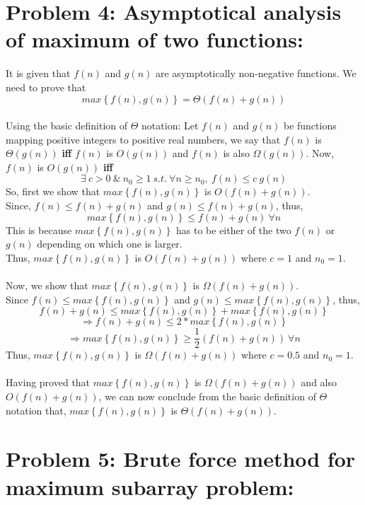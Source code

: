\documentclass[12pt]{report}
\begin{document}
\section{Problem 4: Asymptotical analysis of maximum of two functions:}
It is given that $f(n)$ and $g(n)$ are asymptotically non-negative functions. We need to prove that 
\[max\left \{ f(n), g(n) \right \} = \Theta (f(n) + g(n))\]
\\
Using the basic definition of $\Theta$ notation: 
Let $f(n)$ and $g(n)$ be functions mapping positive integers to positive real numbers, we say that $f(n)$ is $\Theta(g(n))$ \textbf{iff} $f(n)$ is $O(g(n))$ and $f(n)$ is also $\Omega(g(n))$. 
Now, $f(n)$ is $O(g(n))$ \textbf{iff} 
\[\exists\ c > 0 \ \& \ n_{0} \geq 1 \ s.t. \ \forall n \geq n_{0}, \ f(n) \leq c \ g(n)\]
So, first we show that $max\left \{ f(n), g(n) \right \}$ is $O(f(n) + g(n))$. 
\\
Since, $f(n) \leq f(n) + g(n)$ and $g(n) \leq f(n) + g(n)$, thus, 
\[max\left \{ f(n), g(n) \right \} \leq f(n) + g(n) \ \forall n\]
This is because $max\left \{ f(n), g(n) \right \}$ has to be either of the two $f(n)$ or $g(n)$ depending on which one is larger. 
\\
Thus, $max\left \{ f(n), g(n) \right \}$ is $O(f(n) + g(n))$ where $c = 1$ and $n_{0} = 1$.
\\
\\
Now, we show that $max\left \{ f(n), g(n) \right \}$ is $\Omega(f(n) + g(n))$. 
\\
Since $f(n) \leq max\left \{ f(n), g(n) \right \}$ and $g(n) \leq max\left \{ f(n), g(n) \right \}$, thus, 
\[f(n) + g(n) \leq max\left \{ f(n), g(n) \right \} + max\left \{ f(n), g(n) \right \}\]
\[\Rightarrow f(n) + g(n) \leq 2*max\left \{ f(n), g(n) \right \}\]
\[\Rightarrow max\left \{ f(n), g(n) \right \} \geq \frac{1}{2} (f(n) + g(n)) \ \forall n\]
Thus, $max\left \{ f(n), g(n) \right \}$ is $\Omega(f(n) + g(n))$ where $c = 0.5$ and $n_{0} = 1$.
\\ \\
Having proved that $max\left \{ f(n), g(n) \right \}$ is $\Omega(f(n) + g(n))$ and also $O(f(n) + g(n))$, we can now conclude from the basic definition of $\Theta$ notation that, $max\left \{ f(n), g(n) \right \}$ is $\Theta(f(n) + g(n))$.

\section{Problem 5: Brute force method for maximum subarray problem:}



\end{document}
